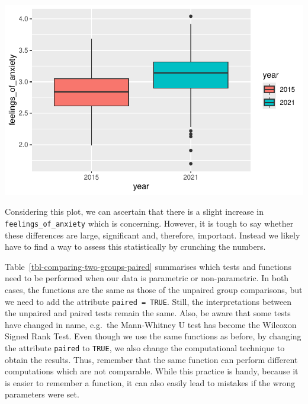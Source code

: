 \documentclass[
  letterpaper,
]{krantz}
\begin{document}
\includegraphics{11_group_comparison_files/figure-pdf/two-paired-groups-boxplot-1.pdf}

Considering this plot, we can ascertain that there is a slight increase
in \texttt{feelings\_of\_anxiety} which is concerning. However, it is
tough to say whether these differences are large, significant and,
therefore, important. Instead we likely have to find a way to assess
this statistically by crunching the numbers.

Table~\ref{tbl-comparing-two-groups-paired} summarises which tests and
functions need to be performed when our data is parametric or
non-parametric. In both cases, the functions are the same as those of
the unpaired group comparisons, but we need to add the attribute
\texttt{paired\ =\ TRUE}. Still, the interpretations between the
unpaired and paired tests remain the same. Also, be aware that some
tests have changed in name, e.g.~the Mann-Whitney U test has become the
Wilcoxon Signed Rank Test. Even though we use the same functions as
before, by changing the attribute \texttt{paired} to \texttt{TRUE}, we
also change the computational technique to obtain the results. Thus,
remember that the same function can perform different computations which
are not comparable. While this practice is handy, because it is easier
to remember a function, it can also easily lead to mistakes if the wrong
parameters were set.
\end{document}
